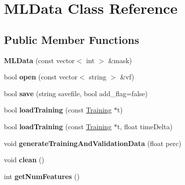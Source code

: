 \hypertarget{class_m_l_data}{\section{\-M\-L\-Data \-Class \-Reference}
\label{class_m_l_data}
}
\subsection*{\-Public \-Member \-Functions}
\begin{DoxyCompactItemize}
\item 
\hypertarget{class_m_l_data_abada8d81c2ec3c2cc7a2255dc7ea9a37}{{\bfseries \-M\-L\-Data} (const vector$<$ int $>$ \&mask)}\label{class_m_l_data_abada8d81c2ec3c2cc7a2255dc7ea9a37}

\item 
\hypertarget{class_m_l_data_a98dfa7ff0fa801bd27a1ef6c9bae5a4e}{bool {\bfseries open} (const vector$<$ string $>$ \&vf)}\label{class_m_l_data_a98dfa7ff0fa801bd27a1ef6c9bae5a4e}

\item 
\hypertarget{class_m_l_data_a6710827f90f4792c7cce2045fa62dc8a}{bool {\bfseries save} (string savefile, bool add\-\_\-flag=false)}\label{class_m_l_data_a6710827f90f4792c7cce2045fa62dc8a}

\item 
\hypertarget{class_m_l_data_a141c2774c2f40940083faaeff226875f}{bool {\bfseries load\-Training} (const \hyperlink{class_training}{\-Training} $\ast$t)}\label{class_m_l_data_a141c2774c2f40940083faaeff226875f}

\item 
\hypertarget{class_m_l_data_a1107ca6cb68a53bd757ae805877f5e23}{bool {\bfseries load\-Training} (const \hyperlink{class_training}{\-Training} $\ast$t, float time\-Delta)}\label{class_m_l_data_a1107ca6cb68a53bd757ae805877f5e23}

\item 
\hypertarget{class_m_l_data_a78eda93fdf296f99d61232fa5b706399}{void {\bfseries generate\-Training\-And\-Validation\-Data} (float perc)}\label{class_m_l_data_a78eda93fdf296f99d61232fa5b706399}

\item 
\hypertarget{class_m_l_data_a364682eec986213f575f80c9192df0e7}{void {\bfseries clean} ()}\label{class_m_l_data_a364682eec986213f575f80c9192df0e7}

\item 
\hypertarget{class_m_l_data_a597490a96a4e97829edd2ee659e2ffcf}{int {\bfseries get\-Num\-Features} ()}\label{class_m_l_data_a597490a96a4e97829edd2ee659e2ffcf}


\end{DoxyCompactItemize}
